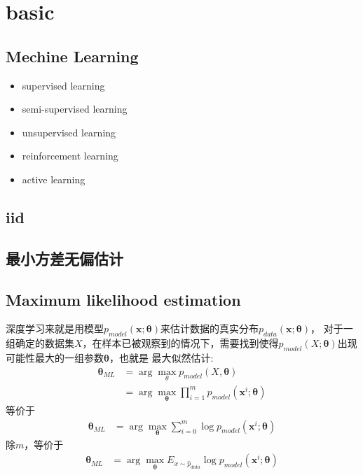 \chapter{basic}

\section{Mechine Learning}
\begin{itemize}
    \item supervised learning
    \item semi-supervised learning
    \item unsupervised learning
    \item reinforcement learning
    \item active learning
\end{itemize}

\section{iid}

\section{最小方差无偏估计}

\section{Maximum likelihood estimation}
深度学习来就是用模型$p_{model}(\boldsymbol{x};\boldsymbol{\theta})$来估计数据的真实分布$p_{data}(\boldsymbol{x};\boldsymbol{\theta})$，
对于一组确定的数据集$X$，在样本已被观察到的情况下，需要找到使得$p_{model}(X; \boldsymbol{\theta})$出现可能性最大的一组参数$\boldsymbol{\theta}$，也就是
最大似然估计:
\begin{equation}
    \begin{split}
        \boldsymbol{\theta}_{ML} &= \arg \max_\theta p_{model}(X, \boldsymbol{\theta}) \\
        &= \arg \max_{\boldsymbol{\theta}} \prod _{i=1}^m p_{model}(\boldsymbol{x}^i; \boldsymbol{\theta})
    \end{split}
\end{equation}
等价于
\begin{equation}
    \begin{split}
        \boldsymbol{\theta}_{ML} &= \arg \max_{\boldsymbol{\theta}} \sum_{i=0}^m \log p_{model}(\boldsymbol{x}^i; \boldsymbol{\theta})
    \end{split}
\end{equation}
除$m$，等价于
\begin{equation}
    \begin{split}
        \boldsymbol{\theta}_{ML} &= \arg \max_{\boldsymbol{\theta}} E _{x \sim \hat p_{data}} \log p_{model}(\boldsymbol{x}^i; \boldsymbol{\theta})
    \end{split}
\end{equation}

